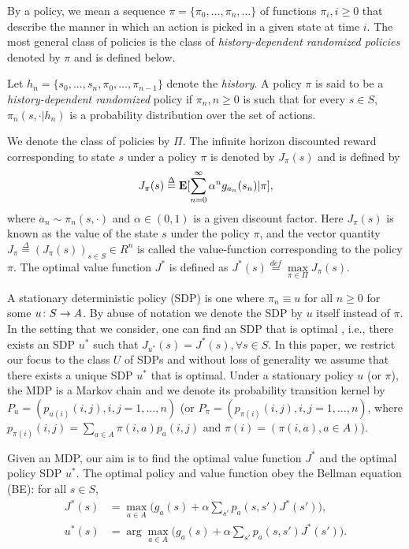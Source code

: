 By a policy, we mean a sequence $\pi=\{\pi_0,\ldots,\pi_n,\ldots\}$ of functions $\pi_i, i\geq 0$ that describe the manner in which an action is picked in a given state at time $i$. The most general class of policies is the class of \emph{history-dependent randomized policies} denoted by $\pi$ and is defined below.
\begin{definition}
Let $h_n=\{s_0,\ldots,s_n, \pi_0, \ldots, \pi_{n-1}\}$ denote the \emph{history}. A policy $\pi$ is said to be a \emph{history-dependent randomized} policy if $\pi_n,n\geq 0$ is such that for every $s\in S$, $\pi_n(s,\cdot|h_n)$ is a probability distribution over the set of actions.
\end{definition}
We denote the class of policies by $\Pi$. The infinite horizon discounted reward corresponding to state $s$ under a policy $\pi$ is denoted by $J_\pi(s)$ and is defined by
\begin{align}
J_\pi(s)\stackrel{\Delta}{=}\mathbf{E}[\sum_{n=0}^\infty \alpha^n g_{a_n}(s_n)|\pi],\nonumber
\end{align}
where $a_{n} \sim \pi_n(s,\cdot)$ and $\alpha \in (0,1)$ is a given discount factor.  Here $J_\pi(s)$ is known as the value of the state $s$ under the policy $\pi$, and the vector quantity $J_\pi\stackrel{\Delta}{=}(J_\pi(s))_{s\in S}\in R^n$ is called the value-function corresponding to the policy $\pi$. The optimal value function $J^*$ is defined as $J^*(s)\stackrel{def}{=}\underset{\pi \in \Pi}{\max} J_\pi(s)$.\par
A stationary deterministic policy (SDP) is one where $\pi_n\equiv u$ for all $n\geq 0$ for some $u\colon S \rightarrow A$. By abuse of notation we denote the SDP by $u$ itself instead of $\pi$. In the setting that we consider, one can find an SDP that is optimal \cite{BertB,Puter}, i.e., there exists an SDP $u^*$ such that $J_{u^*}(s)=J^*(s),\forall s\in S$. In this paper, we restrict our focus to the class $U$ of SDPs and without loss of generality we assume that there exists a unique SDP $u^*$ that is optimal. Under a stationary policy $u$ (or $\pi$), the MDP is a Markov chain and we denote its probability transition kernel by $P_u=(p_{u(i)}(i,j),i,j=1,\ldots,n)$ (or $P_\pi=(p_{\pi(i)}(i,j),i,j=1,\ldots,n)$, where $p_{\pi(i)}(i,j)=\sum_{a\in A}\pi(i,a)p_a(i,j)$ and $\pi(i)=(\pi(i,a), a\in A)$).\par
Given an MDP, our aim is to find the optimal value function $J^*$ and the optimal policy SDP $u^*$. The optimal policy and value function obey the Bellman equation (BE): for all $ s \in S$,
\begin{subequations}\label{bell}
\begin{align}
\label{bellval}J^*(s)&=\max_{ a\in A}\big(g_a(s)+\alpha \sum_{s'}p_a(s,s')J^*(s')\big),\\
\label{bellpol}u^*(s)&=\arg\max_{ a\in A}\big(g_a(s)+\alpha \sum_{s'}p_a(s,s')J^*(s')\big).
\end{align}
\end{subequations}
